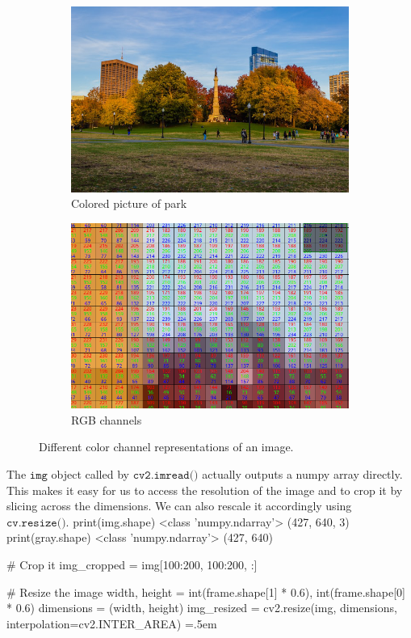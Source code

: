 \documentclass{article}
\newenvironment{cverbatim}
 {\SaveVerbatim{cverb}}
 {\endSaveVerbatim
  \flushleft\fboxrule=0pt\fboxsep=.5em
  \colorbox{cverbbg}{%
    \makebox[\dimexpr\linewidth-2\fboxsep][l]{\BUseVerbatim{cverb}}%
  }
  \endflushleft
}
\theoremstyle{definition}
\theoremstyle{remark}
\theoremstyle{definition}
\begin{document}
\begin{figure}[hbt!]
    \centering
    \begin{subfigure}[b]{0.45\textwidth}
    \centering
        \includegraphics[width=\textwidth]{Images/OpenCV/Park_Full.png}
        \caption{Colored picture of park}
        \label{fig:3d}
    \end{subfigure}
    \begin{subfigure}[b]{0.45\textwidth}
    \centering
        \includegraphics[width=\textwidth]{Images/OpenCV/Park_Cropped.png}
        \caption{RGB channels}
        \label{fig:4d}
    \end{subfigure}
    \label{fig:Park_Images}
    \caption{Different color channel representations of an image. }
\end{figure}

The $\texttt{img}$ object called by $\texttt{cv2.imread()}$ actually outputs a numpy array directly. This makes it easy for us to access the resolution of the image and to crop it by slicing across the dimensions. We can also rescale it accordingly using $\texttt{cv.resize()}$. 
\begin{cverbatim}
print(img.shape)        <class 'numpy.ndarray'> (427, 640, 3)
print(gray.shape)       <class 'numpy.ndarray'> (427, 640)

# Crop it 
img_cropped = img[100:200, 100:200, :]

# Resize the image 
width, height = int(frame.shape[1] * 0.6), int(frame.shape[0] * 0.6) 
dimensions = (width, height) 
img_resized = cv2.resize(img, dimensions, interpolation=cv2.INTER_AREA) 
\end{cverbatim}
\end{document}
